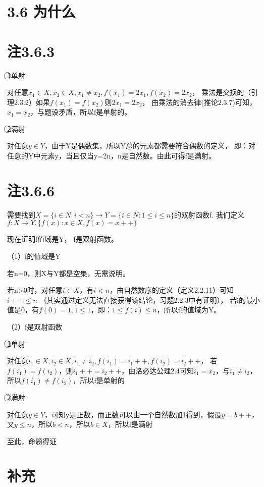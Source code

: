 \documentclass{article}
\theoremstyle{mystyle}
\theoremstyle{zproofstyle}
\begin{document}
\section{3.6 为什么}

\section*{注3.6.3}
\textcircled{1}单射

对任意$x_1 \in X, x_2 \in X, x_1 \neq x_2, f(x_1)=2x_1,f(x_2)=2x_2$，
乘法是交换的（引理2.3.2）如果$f(x_1)=f(x_2)$则$2x_1=2x_2$，
由乘法的消去律(推论2.3.7)可知，$x_1=x_2$，与题设矛盾，所以f是单射的。

\textcircled{2}满射

对任意$y \in Y$，由于Y是偶数集，所以Y总的元素都需要符合偶数的定义，
即：对任意的Y中元素y，当且仅当y=2n，n是自然数。由此可得f是满射。

\section*{注3.6.6}
需要找到$X=\{i \in N: i<n\} \rightarrow Y=\{i \in N: 1\leq i \leq n \}$的双射函数f.
我们定义$f: X \rightarrow Y, \{f(x): x \in X, f(x) = x ++\}$

现在证明f值域是Y， f是双射函数。

（1）f的值域是Y

若n=0，则X与Y都是空集，无需说明。

若n>0时，对任意$i \in X$，有$i < n$，由自然数序的定义（定义2.2.11）可知$i++ \leq n$
（其实通过定义无法直接获得该结论，习题2.2.3中有证明），
若i的最小值是0，有$f(0) = 1,1 \leq 1$，即：$1 \leq f(i) \leq n$，所以f的值域为Y。

（2）f是双射函数

\textcircled{1}单射

对任意$i_1 \in X, i_2 \in X, i_1 \neq i_2, f(i_1) = i_1++, f(i_2) = i_2++$，
若$f(i_1) = f(i_2)$，则$i_1++ = i_2++$，由洛必达公理2.4可知$i_1 = x_2$，与$i_1 \neq i_2$，
所以$f(i_1) \neq f(i_2)$，所以f是单射的

\textcircled{2}满射

对任意$y \in Y$，可知y是正数，而正数可以由一个自然数加1得到，假设$y = b++$，
又$y \leq n$，所以$b < n$，所以$b \in X$，所以f是满射

至此，命题得证

\section*{补充}
\end{document}
